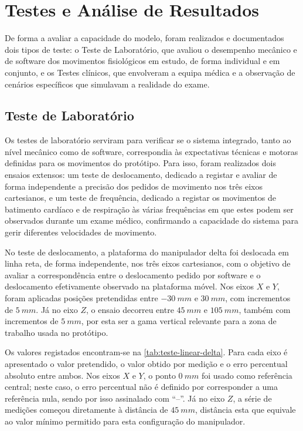 \chapter{Testes e Análise de Resultados}
\label{chap:testes}

De forma a avaliar a capacidade do modelo, foram realizados e documentados dois tipos de teste: o Teste de Laboratório, que avaliou o desempenho mecânico e de software dos movimentos fisiológicos em estudo, de forma individual e em conjunto, e os Testes clínicos, que envolveram a equipa médica e a observação de cenários específicos que simulavam a realidade do exame.

\section{Teste de Laboratório}
Os testes de laboratório serviram para verificar se o sistema integrado, tanto ao nível mecânico como de software, correspondia às expectativas técnicas e motoras definidas para os movimentos do protótipo. Para isso, foram realizados dois ensaios extensos: um teste de deslocamento, dedicado a registar e avaliar de forma independente a precisão dos pedidos de movimento nos três eixos cartesianos, e um teste de frequência, dedicado a registar os movimentos de batimento cardíaco e de respiração às várias frequências em que estes podem ser observados durante um exame médico, confirmando a capacidade do sistema para gerir diferentes velocidades de movimento.

No teste de deslocamento, a plataforma do manipulador delta foi deslocada em linha reta, de forma independente, nos três eixos cartesianos, com o objetivo de avaliar a correspondência entre o deslocamento pedido por software e o deslocamento efetivamente observado na plataforma móvel. Nos eixos \(X\) e \(Y\), foram aplicadas posições pretendidas entre \(-30~mm\) e \(30~mm\), com incrementos de \(5~mm\). Já no eixo \(Z\), o ensaio decorreu entre \(45~mm\) e \(105~mm\), também com incrementos de \(5~mm\), por esta ser a gama vertical relevante para a zona de trabalho usada no protótipo.

Os valores registados encontram-se na \cref{tab:teste-linear-delta}. Para cada eixo é apresentado o valor pretendido, o valor obtido por medição e o erro percentual absoluto entre ambos. Nos eixos \(X\) e \(Y\), o ponto \(0~mm\) foi usado como referência central; neste caso, o erro percentual não é definido por corresponder a uma referência nula, sendo por isso assinalado com ``--''. Já no eixo \(Z\), a série de medições começou diretamente à distância de \(45~mm\), distância esta que equivale ao valor mínimo permitido para esta configuração do manipulador.

